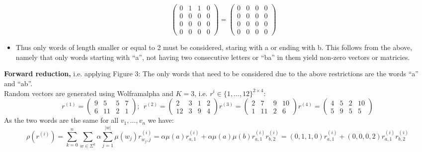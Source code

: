 \begin{itemize}
\[\begin{pmatrix}
                                        0 & 1 & 1 & 0 \\
                                        0 & 0 & 0 & 0 \\
                                        0 & 0 & 0 & 0 \\
                                        0 & 0 & 0 & 0
                                    \end{pmatrix} =  \begin{pmatrix}
                                        0 & 0 & 0 & 0 \\
                                        0 & 0 & 0 & 0 \\
                                        0 & 0 & 0 & 0 \\
                                        0 & 0 & 0 & 0
                                    \end{pmatrix} \]
                \item Thus only words of length smaller or equal to 2 must be considered, staring with a or ending with b. This follows from the above, namely that only words starting with ``a'', not having two consecutive letters or ``ba'' in them yield non-zero vectors or matricies.
            \end{itemize}
            \vspace{1.5cm}

        \textbf{Forward reduction,} i.e. applying \autocite{Kiefer2013OnTC} Figure 3: The only words that need to be considered due to the above restrictions are the words ``a'' and ``ab''.\\
        Random vectors are generated using Wolframalpha and $K=3$, i.e. $r^{i} \in \{1, \dots, 12\}^{2 \times 4}$:
        \[  r^{(1)}= \begin{pmatrix}
                        9 & 5 & 5 & 7 \\
                        6 & 11 & 2 & 1 
                    \end{pmatrix}; \ \
            r^{(2)}= \begin{pmatrix}
                        2 & 3 & 1 & 2 \\
                        12 & 3 & 9 & 4 
                    \end{pmatrix} 
            r^{(3)}= \begin{pmatrix}
                        2 & 7 & 9 & 10 \\
                        1 & 11 & 2 & 6 
                    \end{pmatrix}         
            r^{(4)}= \begin{pmatrix}
                        4 & 5 & 2 & 10 \\
                        5 & 9 & 5 & 5 
                    \end{pmatrix}                     
        \]
        As the two words are the same for all $v_1, \dots, v_n$ we have:
        \[ \rho(r^{(i)}) = \sum_{k=0}^{n} \sum_{w \in \Sigma^k} \alpha \sum_{j=1}^{|w|} \mu(w_j) r^{(i)}_{w_j, j} = \alpha\mu(a) r^{(i)}_{a, 1} + \alpha \mu(a) \mu(b) r^{(i)}_{a, 1} r^{(i)}_{b, 2} = (0,1,1,0) r^{(i)}_{a, 1} + (0,0,0,2) r^{(i)}_{a, 1} r^{(i)}_{b, 2} \]
        
